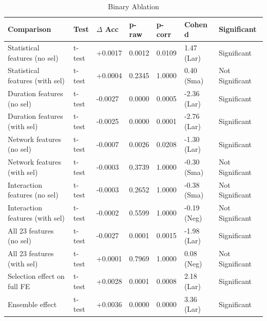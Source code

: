 \documentclass[pdflatex,sn-mathphys-num]{sn-jnl}
\theoremstyle{thmstyleone}%
\theoremstyle{thmstyletwo}%
\theoremstyle{thmstylethree}%
\begin{document}
\begin{table}[htbp]
\centering
\small
\caption{Binary Ablation}
\label{BinaryAblation}
\renewcommand{\arraystretch}{1.0}
\setlength{\tabcolsep}{4pt}
\begin{tabular}{@{}p{3.7cm}p{0.7cm}p{1cm}p{1cm}p{1cm}p{1.5cm}p{2.1cm}@{}}
\toprule
\textbf{Comparison} 
& \textbf{Test} 
& \textbf{$\Delta$ Acc}
& \textbf{p-raw} 
& \textbf{p-corr} 
& \textbf{Cohen d}
& \textbf{Significant}\\
\midrule
Statistical features (no sel)       & t-test & +0.0017 & 0.0012 & 0.0109 & 1.47 (Lar)  & Significant     \\
Statistical features (with sel)     & t-test & +0.0004 & 0.2345 & 1.0000 & 0.40 (Sma)  & Not Significant \\
Duration features (no sel)          & t-test & -0.0027 & 0.0000 & 0.0005 & -2.36 (Lar) & Significant     \\
Duration features (with sel)        & t-test & -0.0025 & 0.0000 & 0.0001 & -2.76 (Lar) & Significant     \\
Network features (no sel)           & t-test & -0.0007 & 0.0026 & 0.0208 & -1.30 (Lar) & Significant     \\
Network features (with sel)         & t-test & -0.0003 & 0.3739 & 1.0000 & -0.30 (Sma) & Not Significant \\
Interaction features (no sel)       & t-test & -0.0003 & 0.2652 & 1.0000 & -0.38 (Sma) & Not Significant \\
Interaction features (with sel)     & t-test & -0.0002 & 0.5599 & 1.0000 & -0.19 (Neg) & Not Significant \\
All 23 features (no sel)            & t-test & -0.0027 & 0.0001 & 0.0015 & -1.98 (Lar) & Significant     \\
All 23 features (with sel)          & t-test & +0.0001 & 0.7969 & 1.0000 & 0.08 (Neg)  & Not Significant \\
Selection effect on full FE         & t-test & +0.0028 & 0.0001 & 0.0008 & 2.18 (Lar)  & Significant     \\
Ensemble effect                     & t-test & +0.0036 & 0.0000 & 0.0000 & 3.36 (Lar)  & Significant     \\
\bottomrule
\end{tabular}
\end{table}
\end{document}
